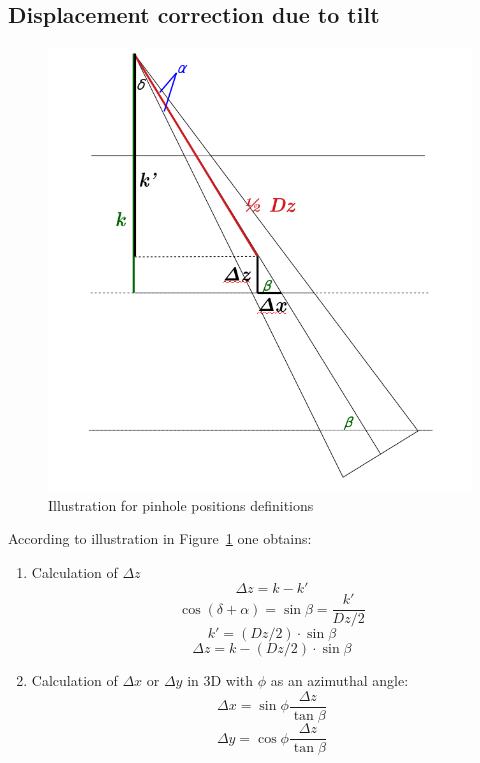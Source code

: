 \documentclass[12pt]{article}
\begin{document}
 
 
\subsection{Displacement correction due to tilt}
 
\begin{figure}[htp]
\centering
\includegraphics[scale=0.5]{figs/fig_def_positions.png}
\caption{Illustration for pinhole positions definitions}
\label{fig:fig_def_positions}
\end{figure}
According to illustration in Figure~\ref{fig:fig_def_positions} one obtains: 
\begin{enumerate}
\item Calculation of $\Delta z$
	\begin{equation} 
	\Delta z = k-k'		
	\end{equation}
	\begin{equation} 
	\cos{(\delta+\alpha)} = \sin{\beta} = \frac{k'}{Dz/2}	
	\end{equation}
	\begin{equation} 
	k' = (Dz/2)\cdot\sin{\beta} 
	\end{equation}
	\begin{equation} 
	\boxed{\Delta z = k - (Dz/2)\cdot \sin{\beta} }		
	\end{equation}
\item Calculation of $\Delta x$ or $\Delta y$ in 3D with $\phi$ as an azimuthal angle:
	\begin{equation} 
	\boxed{\Delta x = \sin{\phi}\frac{\Delta z}{\tan{\beta}}}
	\end{equation}
	\begin{equation}	
	\boxed{\Delta y =\cos{\phi} \frac{\Delta z}{\tan{\beta}}}		
	\end{equation}
\end{enumerate}
\clearpage
\end{document}
